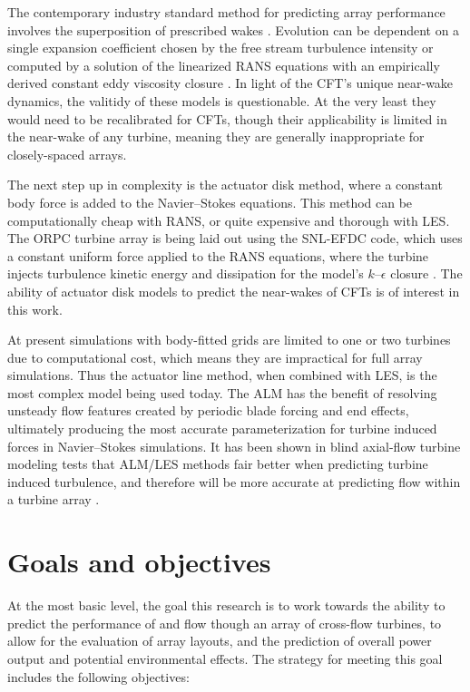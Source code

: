 The contemporary industry standard method for predicting array performance
involves the superposition of prescribed wakes \cite{Stevens2014b}. Evolution
can be dependent on a single expansion coefficient chosen by the free stream
turbulence intensity \cite{Jensen1983, Choi2013} or computed by a solution of
the linearized RANS equations with an empirically derived constant eddy
viscosity closure \cite{Ainslie1988}. In light of the CFT's unique near-wake
dynamics, the valitidy of these models is questionable. At the very least they
would need to be recalibrated for CFTs, though their applicability is limited in
the near-wake of any turbine, meaning they are generally inappropriate for
closely-spaced arrays.
	
The next step up in complexity is the actuator disk method, where a constant
body force is added to the Navier--Stokes equations. This method can be
computationally cheap with RANS, or quite expensive and thorough with LES. The
ORPC turbine array is being laid out using the SNL-EFDC code, which uses a
constant uniform force applied to the RANS equations, where the turbine injects
turbulence kinetic energy and dissipation for the model's $k$--$\epsilon$
closure \cite{Nelson2013}. The ability of actuator disk models to predict the
near-wakes of CFTs is of interest in this work.
	
At present simulations with body-fitted grids are limited to one or two turbines
due to computational cost, which means they are impractical for full array
simulations. Thus the actuator line method, when combined with LES, is the most
complex model being used today. The ALM has the benefit of resolving unsteady
flow features created by periodic blade forcing and end effects, ultimately
producing the most accurate parameterization for turbine induced forces in
Navier--Stokes simulations. It has been shown in blind axial-flow turbine
modeling tests that ALM/LES methods fair better when predicting turbine induced
turbulence, and therefore will be more accurate at predicting flow within a
turbine array \cite{Krogstad2013}.


\section{Goals and objectives}

At the most basic level, the goal this research is to work towards the ability
to predict the performance of and flow though an array of cross-flow turbines,
to allow for the evaluation of array layouts, and the prediction of overall
power output and potential environmental effects. The strategy for meeting this
goal includes the following objectives:

